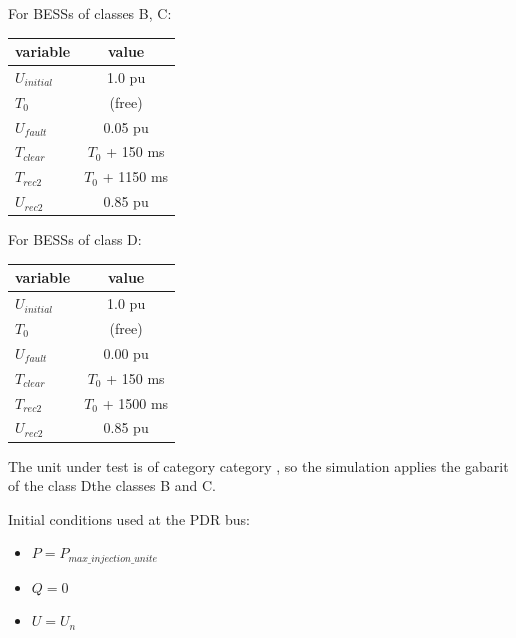     For BESSs of classes B, C:
    \begin{center}
        \begin{tabular}{lc}
            \toprule
            \textbf{variable} & \textbf{value} \\
            \midrule
            $U_{initial}$     & 1.0 pu                   \\
            $T_{0}$           & (free)                   \\
            $U_{fault}$       & 0.05 pu                  \\
            $T_{clear}$       & $T_{0}$ + 150 ms         \\
            $T_{rec2}$        & $T_{0}$ + 1150 ms        \\
            $U_{rec2}$        & 0.85 pu                  \\
            \bottomrule
        \end{tabular}
    \end{center}

    For BESSs of class D:
    \begin{center}
        \begin{tabular}{lc}
            \toprule
            \textbf{variable} & \textbf{value} \\
            \midrule
            $U_{initial}$     & 1.0 pu                   \\
            $T_{0}$           & (free)                   \\
            $U_{fault}$       & 0.00 pu                  \\
            $T_{clear}$       & $T_{0}$ + 150 ms         \\
            $T_{rec2 }$       & $T_{0}$ + 1500 ms        \\
            $U_{rec2}$        & 0.85 pu                  \\
            \bottomrule
        \end{tabular}
    \end{center}

    \noindent The unit under test is of category {{ category }}, so the simulation
    applies the gabarit of the class Dthe classes B and C.

    \begin{description}
        \item Initial conditions used at the PDR bus:
        \begin{itemize}
            \item $P = P_{max\_injection\_unite}$
            \item $Q = 0$
            \item $U = U_{n}$
        \end{itemize}
    \end{description}

